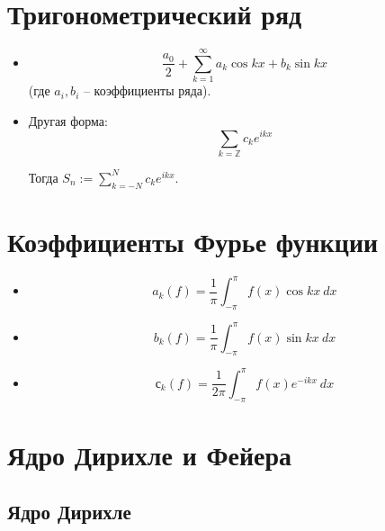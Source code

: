 \documentclass[paper=a4, fontsize=17pt]{article}
\begin{document}
	\begin{center}
	\end{center}

	\section{Тригонометрический ряд}

	\begin{itemize}
		\item $$ \frac{a_0}{2}  + \sum_{k = 1}^{\infty} a_k\cos kx + b_k\sin kx $$
		(где $ a_i, b_i $ -- коэффициенты ряда).

		\item Другая форма:	$$ \sum_{k = \mathbb{Z}} c_k e^{ikx} $$

		Тогда $ S_n := \sum_{k = -N}^{N} c_k e^{ikx} $.
	\end{itemize}

	\section{Коэффициенты Фурье функции}

	\begin{itemize}
		\item $$ a_k(f) = \frac{1}{\pi} \int_{-\pi}^{\pi} f(x) \cos kx ~ dx $$

		\item $$ b_k(f) = \frac{1}{\pi} \int_{-\pi}^{\pi} f(x) \sin kx ~ dx $$

		\item $$ с_k(f) = \frac{1}{2\pi} \int_{-\pi}^{\pi} f(x) e^{-ikx} ~ dx $$

	\end{itemize}

	\section{Ядро Дирихле и Фейера}

	\subsection{Ядро Дирихле}
\end{document}
